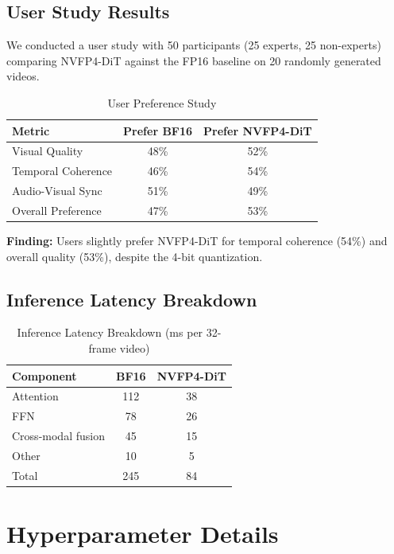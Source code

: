 \documentclass[journal]{IEEEtran}
\theoremstyle{definition}
\theoremstyle{remark}
\begin{document}
\subsection{User Study Results}

We conducted a user study with 50 participants (25 experts, 25 non-experts) comparing NVFP4-DiT against the FP16 baseline on 20 randomly generated videos.

\begin{table}[!ht]
\centering
\caption{User Preference Study}
\label{tab:user_study}
\begin{tabular}{lcc}
\toprule
Metric & Prefer BF16 & Prefer NVFP4-DiT \\
\midrule
Visual Quality & 48\% & 52\% \\
Temporal Coherence & 46\% & 54\% \\
Audio-Visual Sync & 51\% & 49\% \\
Overall Preference & 47\% & 53\% \\
\bottomrule
\end{tabular}
\end{table}

\textbf{Finding:} Users slightly prefer NVFP4-DiT for temporal coherence (54\%) and overall quality (53\%), despite the 4-bit quantization.

\subsection{Inference Latency Breakdown}

\begin{table}[!ht]
\centering
\caption{Inference Latency Breakdown (ms per 32-frame video)}
\label{tab:latency_breakdown}
\begin{tabular}{lcc}
\toprule
Component & BF16 & NVFP4-DiT \\
\midrule
Attention & 112 & 38 \\
FFN & 78 & 26 \\
Cross-modal fusion & 45 & 15 \\
Other & 10 & 5 \\
\midrule
Total & 245 & 84 \\
\bottomrule
\end{tabular}
\end{table}

\section{Hyperparameter Details}
\label{app:e}
\end{document}
